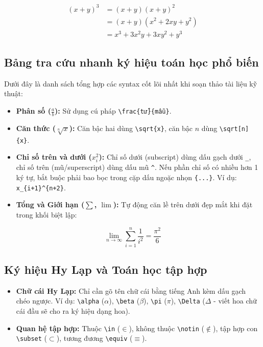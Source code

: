 \documentclass{article}
\begin{document}
\begin{align}
    (x + y)^3 &= (x + y)(x + y)^2 \\
              &= (x + y)(x^2 + 2xy + y^2) \\
              &= x^3 + 3x^2y + 3xy^2 + y^3 \label{eq:hangdangthuc}
\end{align}

\subsection{Bảng tra cứu nhanh ký hiệu toán học phổ biến}
Dưới đây là danh sách tổng hợp các syntax cốt lõi nhất khi soạn thảo tài liệu kỹ thuật:

\begin{itemize}
    \item \textbf{Phân số ($\frac{a}{b}$):} Sử dụng cú pháp \texttt{\textbackslash frac\{tử\}\{mẫu\}}.
    \item \textbf{Căn thức ($\sqrt[n]{x}$):} Căn bậc hai dùng \texttt{\textbackslash sqrt\{x\}}, căn bậc $n$ dùng \texttt{\textbackslash sqrt[n]\{x\}}.
    \item \textbf{Chỉ số trên và dưới ($x_{i}^2$):} Chỉ số dưới (subscript) dùng dấu gạch dưới \texttt{\_}, chỉ số trên (mũ/superscript) dùng dấu mũ \texttt{\^}. Nếu phần chỉ số có nhiều hơn 1 ký tự, bắt buộc phải bao bọc trong cặp dấu ngoặc nhọn \texttt{\{...\}}. Ví dụ: \texttt{x\_\{i+1\}\^{}\{n+2\}}.
    \item \textbf{Tổng và Giới hạn ($\sum$, $\lim$):} Tự động căn lề trên dưới đẹp mắt khi đặt trong khối biệt lập:
\end{itemize}

\begin{equation}
    \lim_{n \to \infty} \sum_{i=1}^{n} \frac{1}{i^2} = \frac{\pi^2}{6}
\end{equation}

\subsection{Ký hiệu Hy Lạp và Toán học tập hợp}
\begin{itemize}
    \item \textbf{Chữ cái Hy Lạp:} Chỉ cần gõ tên chữ cái bằng tiếng Anh kèm dấu gạch chéo ngược. Ví dụ: \texttt{\textbackslash alpha} ($\alpha$), \texttt{\textbackslash beta} ($\beta$), \texttt{\textbackslash pi} ($\pi$), \texttt{\textbackslash Delta} ($\Delta$ - viết hoa chữ cái đầu sẽ cho ra ký hiệu dạng hoa).
    \item \textbf{Quan hệ tập hợp:} Thuộc \texttt{\textbackslash in} ($\in$), không thuộc \texttt{\textbackslash notin} ($\notin$), tập hợp con \texttt{\textbackslash subset} ($\subset$), tương đương \texttt{\textbackslash equiv} ($\equiv$).
\end{itemize}
\end{document}
